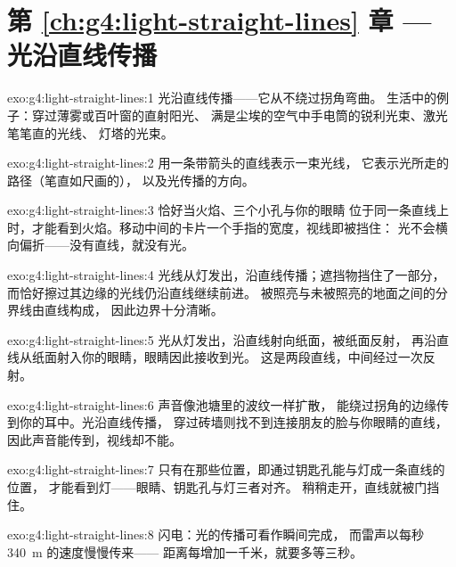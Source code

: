 \section*{第 \ref{ch:g4:light-straight-lines} 章 --- 光沿直线传播}

\begin{solution}{exo:g4:light-straight-lines:1}
光沿直线传播——它从不绕过拐角弯曲。
生活中的例子：穿过薄雾或百叶窗的直射阳光、
满是尘埃的空气中手电筒的锐利光束、激光笔笔直的光线、
灯塔的光束。
\end{solution}

\begin{solution}{exo:g4:light-straight-lines:2}
用一条带箭头的直线表示一束光线，
它表示光所走的路径（笔直如尺画的），
以及光传播的方向。
\end{solution}

\begin{solution}{exo:g4:light-straight-lines:3}
恰好当火焰、三个小孔与你的眼睛
位于同一条直线上时，才能看到火焰。移动中间的卡片一个手指的宽度，视线即被挡住：
光不会横向偏折——没有直线，就没有光。
\end{solution}

\begin{solution}{exo:g4:light-straight-lines:4}
光线从灯发出，沿直线传播；遮挡物挡住了一部分，
而恰好擦过其边缘的光线仍沿直线继续前进。
被照亮与未被照亮的地面之间的分界线由直线构成，
因此边界十分清晰。
\end{solution}

\begin{solution}{exo:g4:light-straight-lines:5}
光从灯发出，沿直线射向纸面，被纸面反射，
再沿直线从纸面射入你的眼睛，眼睛因此接收到光。
这是两段直线，中间经过一次反射。
\end{solution}

\begin{solution}{exo:g4:light-straight-lines:6}
声音像池塘里的波纹一样扩散，
能绕过拐角的边缘传到你的耳中。光沿直线传播，
穿过砖墙则找不到连接朋友的脸与你眼睛的直线，
因此声音能传到，视线却不能。
\end{solution}

\begin{solution}{exo:g4:light-straight-lines:7}
只有在那些位置，即通过钥匙孔能与灯成一条直线的位置，
才能看到灯——眼睛、钥匙孔与灯三者对齐。
稍稍走开，直线就被门挡住。
\end{solution}

\begin{solution}{exo:g4:light-straight-lines:8}
闪电：光的传播可看作瞬间完成，
而雷声以每秒 \qty{340}{m} 的速度慢慢传来——
距离每增加一千米，就要多等三秒。
\end{solution}

